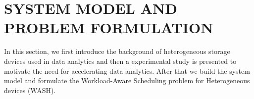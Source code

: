 \documentclass[conference]{IEEEtran}
\begin{document}
\section{SYSTEM MODEL AND PROBLEM FORMULATION}\label{SYSTEM_MODEL}
In this section, we first introduce the background of heterogeneous storage devices used in data analytics and then a experimental study is  presented to motivate the need for accelerating data analytics. After that we build the system model and formulate the Workload-Aware Scheduling problem for Heterogeneous devices (WASH).
\end{document}
